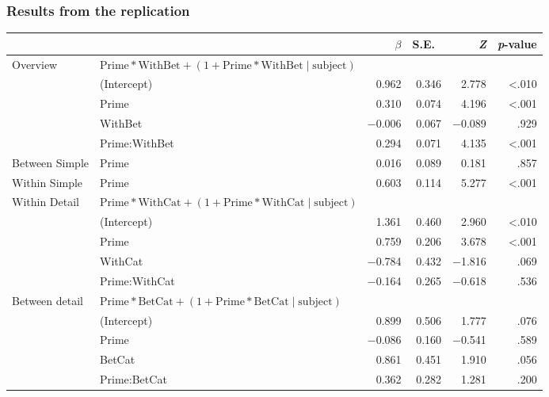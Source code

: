 \documentclass[noamssymb]{beamer}
\begin{document}
\begin{frame}

\frametitle{{\ftf Results from the replication}}

\begin{adjustbox}{width=1\textwidth,center=\textwidth}
    \begin{tabular}{llrrrr}
      \hline
      & & \(\beta\) & S.E.\ & \emph{Z} & \emph{p}-value  \\
      \hline
      Overview & \(\text{Prime} * \text{WithBet} + (1 + \text{Prime} * \text{WithBet} \mid \text{subject})\) & & & \\
      & (Intercept)   & 0.962  & 0.346 &  2.778 & <.010 \\
      & Prime         & 0.310  & 0.074 &  4.196 & <.001 \\
      & WithBet       & \(-\)0.006 & 0.067 & \(-\)0.089 &  .929 \\
      & Prime:WithBet & 0.294  & 0.071 &  4.135 & <.001 \\
      Between Simple & Prime & 0.016 & 0.089 & 0.181 & .857  \\
      Within Simple  & Prime & 0.603 & 0.114 & 5.277 & <.001 \\
      Within Detail & \multicolumn{2}{l}{\(\text{Prime} * \text{WithCat} + (1 + \text{Prime} * \text{WithCat} \mid \text{subject})\)}  & & & \\
      & (Intercept)   &  1.361 & 0.460 &  2.960 & <.010 \\
      & Prime         &  0.759 & 0.206 &  3.678 & <.001 \\
      & WithCat       & \(-\)0.784 & 0.432 & \(-\)1.816 & .069  \\
      & Prime:WithCat & \(-\)0.164 & 0.265 & \(-\)0.618 & .536  \\
      Between detail & \multicolumn{2}{l}{\(\text{Prime} * \text{BetCat} + (1 + \text{Prime} * \text{BetCat} \mid \text{subject})\)}  & & & \\
      & (Intercept)  &  0.899 & 0.506 &  1.777 & .076 \\
      & Prime        & \(-\)0.086 & 0.160 & \(-\)0.541 & .589 \\
      & BetCat       & 0.861  & 0.451 &  1.910 & .056 \\
      & Prime:BetCat &  0.362 & 0.282 &  1.281 & .200 \\
      \hline
    \end{tabular}
  \end{adjustbox}



\end{frame}
\end{document}
